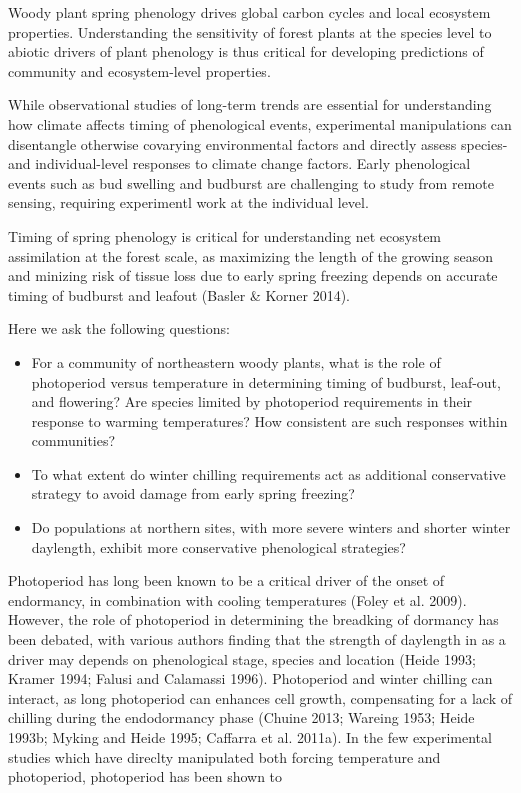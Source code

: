 \documentclass{article}
\begin{document}
Woody plant spring phenology drives global carbon cycles and local ecosystem properties. Understanding the sensitivity of forest plants at the species level to abiotic drivers of plant phenology is thus critical for developing predictions of community and ecosystem-level properties. 

While observational studies of long-term trends are essential for understanding how climate affects timing of phenological events, experimental manipulations can disentangle otherwise covarying environmental factors and directly assess species- and individual-level responses to climate change factors. Early phenological events such as bud swelling and budburst are challenging to study from remote sensing, requiring experimentl work at the individual level.

Timing of spring phenology is critical for understanding net ecosystem assimilation at the forest scale, as maximizing the length of the growing season and minizing risk of tissue loss due to early spring freezing depends on accurate timing of budburst and leafout (Basler \& Korner 2014).  

Here we ask the following questions:
\begin{itemize}
\item{For a community of northeastern woody plants, what is the role of photoperiod versus temperature in determining timing of budburst, leaf-out, and flowering? Are species limited by photoperiod requirements in their response to warming temperatures? How consistent are such responses within communities?}
\item{To what extent do winter chilling requirements act as additional conservative strategy to avoid damage from early spring freezing?}
\item{Do populations at northern sites, with more severe winters and shorter winter daylength, exhibit more conservative phenological strategies?}
\end{itemize}

Photoperiod has long been known to be a critical driver of the onset of endormancy, in combination with cooling temperatures (Foley et al. 2009). However, the role of photoperiod in determining the breadking of dormancy has been debated, with various authors finding that the strength of daylength in as a driver may depends on phenological stage, species and location (Heide 1993; Kramer 1994; Falusi and Calamassi 1996). Photoperiod and winter chilling can interact, as long photoperiod can enhances cell growth, compensating for a lack of chilling during the endodormancy phase (Chuine 2013; Wareing 1953; Heide 1993b; Myking and Heide 1995; Caffarra et al. 2011a). In the few experimental studies which have direclty manipulated both forcing temperature and photoperiod, photoperiod has been shown to 
\end{document}
